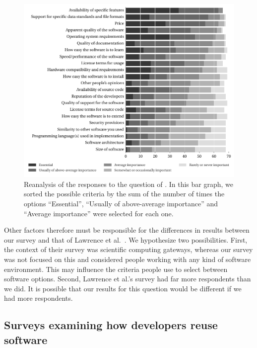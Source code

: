 \documentclass{casicswhitepaper}
\begin{document}
\begin{figure}[t]
  \vspace*{-1ex}
  \centering
  \hspace*{-1ex}%
  \includegraphics{files/plots/bar-graph-criteria-ready-to-run-reranked.pdf}
  \vspace*{-4ex}
  \caption{Reanalysis of the responses to the question of \protect{}.  In this bar graph, we sorted the possible criteria by the sum of the number of times the options ``Essential'', ``Usually of above-average importance'' and ``Average importance'' were selected for each one.}
  \label{criteria-ready-to-run-reranked}
\end{figure}

Other factors therefore must be responsible for the differences in results between our survey and that of Lawrence et al.~\cite{lawrence2015science}.  We hypothesize two possibilities.  First, the context of their survey was scientific computing gateways, whereas our survey was not focused on this and considered people working with any kind of software environment.  This may influence the criteria people use to select between software options.  Second, Lawrence et al.'s survey had far more respondents than we did.  It is possible that our results for this question would be different if we had more respondents.


\subsection{Surveys examining how developers reuse software}
\end{document}
